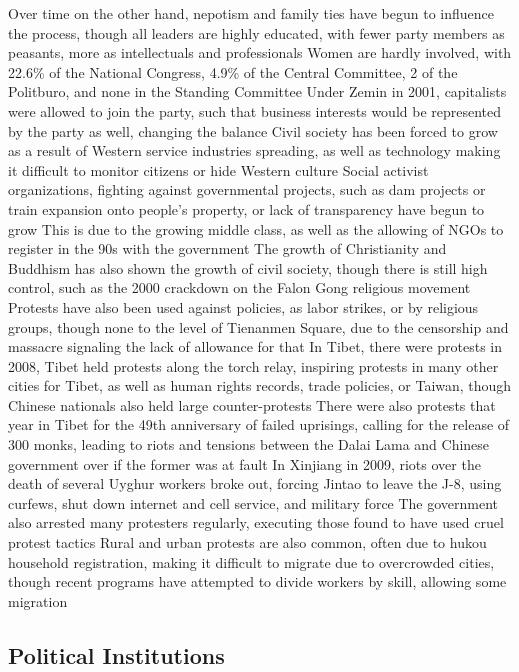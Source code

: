 \documentclass[11 pt, twoside]{article}
\newenvironment{outline*}
{
	\begin{outline}[enumerate]
	}
	{\end{outline}
}
\begin{document}
\begin{outline*}
\3 Over time on the other hand, nepotism and family ties have begun to influence the process, though all leaders are highly educated, with fewer party members as peasants, more as intellectuals and professionals
\2 Women are hardly involved, with 22.6\% of the National Congress, 4.9\% of the Central Committee, 2 of the Politburo, and none in the Standing Committee
\2 Under Zemin in 2001, capitalists were allowed to join the party, such that business interests would be represented by the party as well, changing the balance
\1 Civil society has been forced to grow as a result of Western service industries spreading, as well as technology making it difficult to monitor citizens or hide Western culture
\2 Social activist organizations, fighting against governmental projects, such as dam projects or train expansion onto people's property, or lack of transparency have begun to grow
\3 This is due to the growing middle class, as well as the allowing of NGOs to register in the 90s with the government
\2 The growth of Christianity and Buddhism has also shown the growth of civil society, though there is still high control, such as the 2000 crackdown on the Falon Gong religious movement
\1 Protests have also been used against policies, as labor strikes, or by religious groups, though none to the level of Tienanmen Square, due to the censorship and massacre signaling the lack of allowance for that
\2 In Tibet, there were protests in 2008, Tibet held protests along the torch relay, inspiring protests in many other cities for Tibet, as well as human rights records, trade policies, or Taiwan, though Chinese nationals also held large counter-protests
\3 There were also protests that year in Tibet for the 49th anniversary of failed uprisings, calling for the release of 300 monks, leading to riots and tensions between the Dalai Lama and Chinese government over if the former was at fault
\2 In Xinjiang in 2009, riots over the death of several Uyghur workers broke out, forcing Jintao to leave the J-8, using curfews, shut down internet and cell service, and military force
\2 The government also arrested many protesters regularly, executing those found to have used cruel protest tactics
\2 Rural and urban protests are also common, often due to hukou household registration, making it difficult to migrate due to overcrowded cities, though recent programs have attempted to divide workers by skill, allowing some migration
\end{outline*}
\subsection{Political Institutions}
\end{document}
